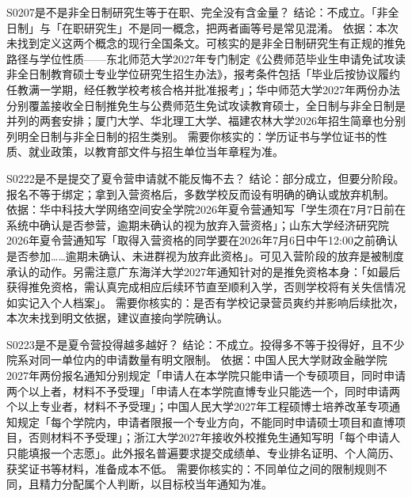 \begin{qa}{S0207}{是不是非全日制研究生等于在职、完全没有含金量？}
结论：不成立。「非全日制」与「在职研究生」不是同一概念，把两者画等号是常见混淆。
依据：本次未找到定义这两个概念的现行全国条文。可核实的是非全日制研究生有正规的推免路径与学位性质——东北师范大学2027年专门制定《公费师范毕业生申请免试攻读非全日制教育硕士专业学位研究生招生办法》，报考条件包括「毕业后按协议履约任教满一学期，经任教学校考核合格并批准报考」；华中师范大学2027年两份办法分别覆盖接收全日制推免生与公费师范生免试攻读教育硕士，全日制与非全日制是并列的两套安排；厦门大学、华北理工大学、福建农林大学2026年招生简章也分别列明全日制与非全日制的招生类别。
需要你核实的：学历证书与学位证书的性质、就业政策，以教育部文件与招生单位当年章程为准。
\end{qa}

\begin{qa}{S0222}{是不是提交了夏令营申请就不能反悔不去？}
结论：部分成立，但要分阶段。报名不等于绑定；拿到入营资格后，多数学校反而设有明确的确认或放弃机制。
依据：华中科技大学网络空间安全学院2026年夏令营通知写「学生须在7月7日前在系统中确认是否参营，逾期未确认的视为放弃入营资格」；山东大学经济研究院2026年夏令营通知写「取得入营资格的同学要在2026年7月6日中午12:00之前确认是否参加……逾期未确认、未进群视为放弃此资格」。可见入营阶段的放弃是被制度承认的动作。另需注意广东海洋大学2027年通知针对的是推免资格本身：「如最后获得推免资格，需认真完成相应后续环节直至顺利入学，否则学校将有关失信情况如实记入个人档案」。
需要你核实的：是否有学校记录营员爽约并影响后续批次，本次未找到明文依据，建议直接向学院确认。
\end{qa}

\begin{qa}{S0223}{是不是夏令营投得越多越好？}
结论：不成立。投得多不等于投得好，且不少院系对同一单位内的申请数量有明文限制。
依据：中国人民大学财政金融学院2027年两份报名通知分别规定「申请人在本学院只能申请一个专硕项目，同时申请两个以上者，材料不予受理」「申请人在本学院直博专业只能选一个，同时申请两个以上专业者，材料不予受理」；中国人民大学2027年工程硕博士培养改革专项通知规定「每个学院内，申请者限报一个专业方向，不能同时申请硕士项目和直博项目，否则材料不予受理」；浙江大学2027年接收外校推免生通知写明「每个申请人只能填报一个志愿」。此外报名普遍要求提交成绩单、专业排名证明、个人简历、获奖证书等材料，准备成本不低。
需要你核实的：不同单位之间的限制规则不同，且精力分配属个人判断，以目标校当年通知为准。
\end{qa}

